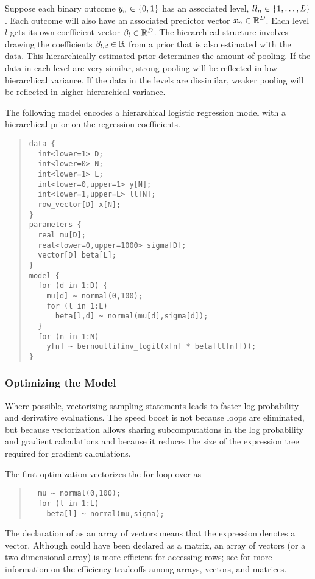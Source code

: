 Suppose each binary outcome $y_n \in \{ 0,1 \}$ has an associated
level, $ll_n \in \{ 1,\ldots,L \}$.  Each outcome will also have
an associated predictor vector $x_n \in \mathbb{R}^D$.  Each level $l$
gets its own coefficient vector $\beta_l \in \mathbb{R}^D$.  The
hierarchical structure involves drawing the coefficients $\beta_{l,d}
\in \mathbb{R}$ from a prior that is also estimated with the data.  This
hierarchically estimated prior determines the amount of pooling.  If
the data in each level are very similar, strong pooling will be
reflected in low hierarchical variance.  If the data in the levels are
dissimilar, weaker pooling will be reflected in higher hierarchical variance.

The following model encodes a hierarchical logistic regression model
with a hierarchical prior on the regression coefficients.
%
\begin{quote}
\begin{Verbatim}[fontsize=\small]
data {
  int<lower=1> D;
  int<lower=0> N;
  int<lower=1> L;
  int<lower=0,upper=1> y[N];
  int<lower=1,upper=L> ll[N];
  row_vector[D] x[N];
}
parameters {
  real mu[D];
  real<lower=0,upper=1000> sigma[D];
  vector[D] beta[L];
}
model {
  for (d in 1:D) {
    mu[d] ~ normal(0,100);
    for (l in 1:L)
      beta[l,d] ~ normal(mu[d],sigma[d]);
  }
  for (n in 1:N)
    y[n] ~ bernoulli(inv_logit(x[n] * beta[ll[n]]));
}
\end{Verbatim}
\end{quote}  
%

\subsubsection{Optimizing the Model}

Where possible, vectorizing sampling statements leads to faster log
probability and derivative evaluations.  The speed boost is not
because loops are eliminated, but because vectorization allows sharing
subcomputations in the log probability and gradient calculations and
because it reduces the size of the expression tree required for
gradient calculations.

The first optimization vectorizes the for-loop over  as
%
\begin{quote}
\begin{Verbatim}
  mu ~ normal(0,100);
  for (l in 1:L)
    beta[l] ~ normal(mu,sigma);
\end{Verbatim}
\end{quote}
%
The declaration of  as an array of vectors means that the
expression  denotes a vector.  Although 
could have been declared as a matrix, an array of vectors (or a
two-dimensional array) is more efficient for accessing rows; see
 for more information on the efficiency
tradeoffs among arrays, vectors, and matrices.

